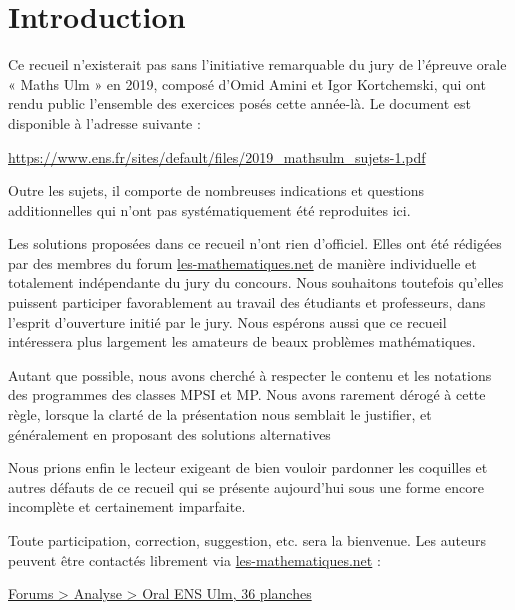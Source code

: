 \chapter*{Introduction}
 
Ce recueil n'existerait pas sans l'initiative remarquable du jury de l'épreuve orale « Maths Ulm » en 2019, composé d'Omid Amini et Igor Kortchemski, qui ont rendu public l'ensemble des exercices posés cette année-là.
Le document est disponible à l'adresse suivante :
\begin{center}
    \url{https://www.ens.fr/sites/default/files/2019_mathsulm_sujets-1.pdf}
\end{center}
Outre les sujets, il comporte de nombreuses indications et questions additionnelles qui n'ont pas systématiquement été reproduites ici.

\bigbreak

Les solutions proposées dans ce recueil n'ont rien d'officiel. Elles ont été rédigées par des membres du forum \href{http://www.les-mathematiques.net/phorum/}{les-mathematiques.net} de manière individuelle et totalement indépendante du jury du concours. Nous souhaitons toutefois qu'elles puissent participer favorablement au travail des étudiants et professeurs, dans l'esprit d'ouverture initié par le jury. Nous espérons aussi que ce recueil intéressera plus largement les amateurs de beaux problèmes mathématiques.

\bigbreak

Autant que possible, nous avons cherché à respecter le contenu et les notations des programmes des classes MPSI et MP. Nous avons rarement dérogé à cette règle, lorsque la clarté de la présentation nous semblait le justifier, et généralement en proposant des solutions alternatives

\bigbreak

Nous prions enfin le lecteur exigeant de bien vouloir pardonner les coquilles et autres défauts de ce recueil qui se présente aujourd'hui sous une forme encore incomplète et certainement imparfaite. 

\bigbreak

\noindent
Toute participation, correction, suggestion, etc. sera la bienvenue.
Les auteurs peuvent être contactés librement via  
\href{http://www.les-mathematiques.net/phorum/}{les-mathematiques.net}  :
\begin{center}
\href{http://www.les-mathematiques.net/phorum/read.php?4,1841908}{Forums > Analyse > Oral ENS Ulm, 36 planches}
\end{center}
